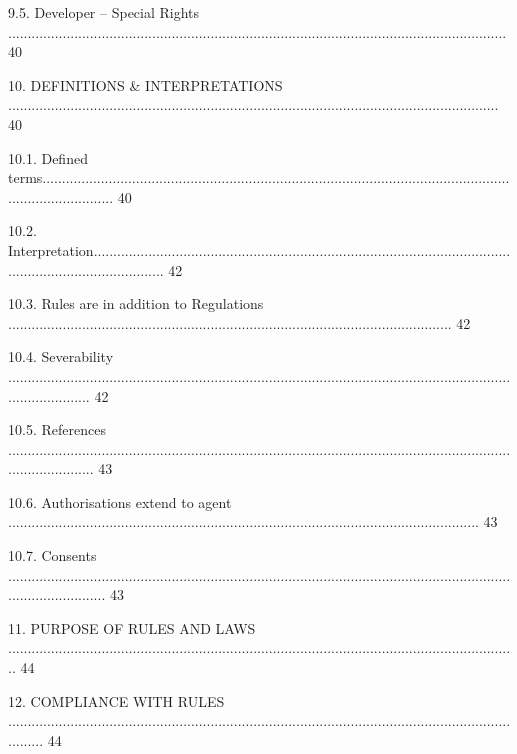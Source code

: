 \documentclass{article}
\begin{document}
{\fontsize{9.99}{1}9.5. Developer – Special Rights ................................................................................................................................ 40 }

{\fontsize{9.99}{1}10. DEFINITIONS \& INTERPRETATIONS .............................................................................................................................. 40 }

{\fontsize{9.99}{1}10.1. Defined terms................................................................................................................................................... 40 }

{\fontsize{9.99}{1}10.2. Interpretation................................................................................................................................................... 42 }

{\fontsize{9.99}{1}10.3. Rules are in addition to Regulations .................................................................................................................. 42 }

{\fontsize{9.99}{1}10.4. Severability ...................................................................................................................................................... 42 }

{\fontsize{9.99}{1}10.5. References ....................................................................................................................................................... 43 }

{\fontsize{9.99}{1}10.6. Authorisations extend to agent ......................................................................................................................... 43 }

{\fontsize{9.99}{1}10.7. Consents .......................................................................................................................................................... 43 }

{\fontsize{9.99}{1}11. PURPOSE OF RULES AND LAWS ................................................................................................................................... 44 }

{\fontsize{9.99}{1}12. COMPLIANCE WITH RULES .......................................................................................................................................... 44 }

\newpage
\end{document}

